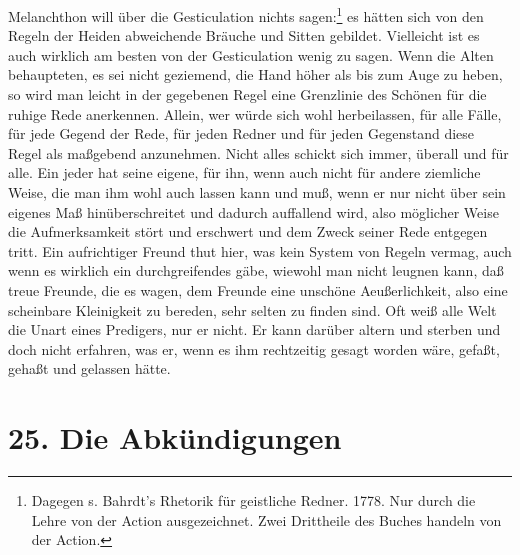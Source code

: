 Melanchthon will über die Gesticulation nichts sagen:\footnote{Dagegen s. Bahrdt’s Rhetorik für geistliche Redner. 1778. Nur durch die Lehre von der Action ausgezeichnet. Zwei Drittheile des Buches handeln von der Action.} es hätten sich von den Regeln der Heiden abweichende Bräuche und Sitten gebildet. Vielleicht ist es auch wirklich am besten von der Gesticulation wenig zu sagen. Wenn die Alten behaupteten, es sei nicht geziemend, die Hand höher als bis zum Auge zu heben, so wird man leicht in der gegebenen Regel eine Grenzlinie des Schönen für die ruhige Rede anerkennen. Allein, wer würde sich wohl herbeilassen, für alle Fälle, für jede Gegend der Rede, für jeden Redner und für jeden Gegenstand diese Regel als maßgebend anzunehmen. Nicht alles schickt sich immer, überall und für alle. Ein jeder hat seine eigene, für ihn, wenn auch nicht für andere ziemliche Weise, die man ihm wohl auch lassen kann und muß, wenn er nur nicht über sein eigenes Maß hinüberschreitet und dadurch auffallend wird, also möglicher Weise die Aufmerksamkeit stört und erschwert und dem Zweck seiner Rede entgegen tritt. Ein
aufrichtiger Freund thut hier, was kein System von Regeln vermag, auch wenn es wirklich ein durchgreifendes gäbe, wiewohl man nicht leugnen kann, daß treue Freunde, die es wagen, dem Freunde eine unschöne Aeußerlichkeit, also eine scheinbare Kleinigkeit zu bereden, sehr selten zu finden sind. Oft weiß alle Welt die Unart eines Predigers, nur er nicht. Er kann darüber altern und sterben und doch nicht erfahren, was er, wenn es ihm rechtzeitig gesagt worden wäre, gefaßt, gehaßt und gelassen hätte.

\section{25. Die Abkündigungen}

